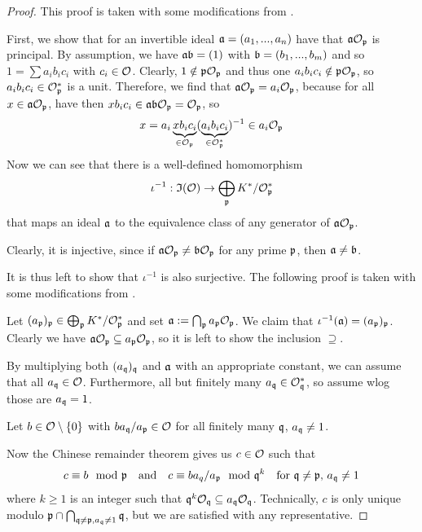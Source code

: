 \begin{proof}
    This proof is taken with some modifications from \cite[Prop.~I.12.9]{neukirch}.

    First, we show that for an invertible ideal $\mathfrak{a} = (a_1, ..., a_n)$ have that $\mathfrak{a}\mathcal{O}_{\mathfrak{p}}$ is principal.
    By assumption, we have $\mathfrak{a}\mathfrak{b} = (1)$ with $\mathfrak{b} = (b_1, ..., b_m)$ and so $1 = \sum a_i b_i c_i$ with $c_i \in \mathcal{O}$.
    Clearly, $1 \notin \mathfrak{p}\mathcal{O}_{\mathfrak{p}}$ and thus one $a_i b_i c_i \notin \mathfrak{p}\mathcal{O}_{\mathfrak{p}}$, so $a_i b_i c_i \in \mathcal{O}_{\mathfrak{p}}^*$ is a unit.
    Therefore, we find that $\mathfrak{a}\mathcal{O}_{\mathfrak{p}} = a_i\mathcal{O}_{\mathfrak{p}}$, because for all $x \in \mathfrak{a}\mathcal{O}_{\mathfrak{p}}$, have then $x b_i c_i \in \mathfrak{a}\mathfrak{b}\mathcal{O}_{\mathfrak{p}} = \mathcal{O}_{\mathfrak{p}}$, so
    \begin{equation*}
        x = a_i \underbrace{x b_i c_i}_{\in \mathcal{O}_{\mathfrak{p}}} (\underbrace{a_ib_ic_i}_{\in\mathcal{O}_{\mathfrak{p}}^*})^{-1} \in a_i \mathcal{O}_{\mathfrak{p}}
    \end{equation*}
    Now we can see that there is a well-defined homomorphism
    \begin{equation*}
        \iota^{-1}: \mathfrak{I}(\mathcal{O}) \to \bigoplus_{\mathfrak{p}} K^*/\mathcal{O}_{\mathfrak{p}}^*
    \end{equation*}
    that maps an ideal $\mathfrak{a}$ to the equivalence class of any generator of $\mathfrak{a}\mathcal{O}_{\mathfrak{p}}$.
    
    Clearly, it is injective, since if $\mathfrak{a}\mathcal{O}_{\mathfrak{p}} \neq \mathfrak{b}\mathcal{O}_{\mathfrak{p}}$ for any prime $\mathfrak{p}$, then $\mathfrak{a} \neq \mathfrak{b}$.

    It is thus left to show that $\iota^{-1}$ is also surjective.
    The following proof is taken with some modifications from \cite[Prop.~I.12.2]{neukirch}.

    Let $(a_{\mathfrak{p}})_{\mathfrak{p}} \in \bigoplus_{\mathfrak{p}} K^*/\mathcal{O}_{\mathfrak{p}}^*$ and set $\mathfrak{a} := \bigcap_{\mathfrak{p}} a_{\mathfrak{p}} \mathcal{O}_{\mathfrak{p}}$.
    We claim that $\iota^{-1}(\mathfrak{a}) = (a_{\mathfrak{p}})_{\mathfrak{p}}$. 
    Clearly we have $\mathfrak{a}\mathcal{O}_{\mathfrak{p}} \subseteq a_{\mathfrak{p}}\mathcal{O}_{\mathfrak{p}}$, so it is left to show the inclusion $\supseteq$.

    By multiplying both $(a_{\mathfrak{q}})_{\mathfrak{q}}$ and $\mathfrak{a}$ with an appropriate constant, we can assume that all $a_{\mathfrak{q}} \in \mathcal{O}$.
    Furthermore, all but finitely many $a_{\mathfrak{q}} \in \mathcal{O}_{\mathfrak{q}}^*$, so assume wlog those are $a_{\mathfrak{q}} = 1$.

    Let $b \in \mathcal{O} \setminus \{ 0 \}$ with $ba_{\mathfrak{q}}/a_{\mathfrak{p}} \in \mathcal{O}$ for all finitely many $\mathfrak{q}$, $a_{\mathfrak{q}} \neq 1$.

    Now the Chinese remainder theorem gives us $c \in \mathcal{O}$ such that
    \begin{equation*}
        c \equiv b \mod {\mathfrak{p}} \quad \text{and} \quad c \equiv b a_q/a_{\mathfrak{p}} \mod {\mathfrak{q}}^k \quad \text{for $\mathfrak{q} \neq \mathfrak{p}$, $a_{\mathfrak{q}} \neq 1$}
    \end{equation*}
    where $k \geq 1$ is an integer such that $\mathfrak{q}^k\mathcal{O}_{\mathfrak{q}} \subseteq a_{\mathfrak{q}}\mathcal{O}_{\mathfrak{q}}$.
    Technically, $c$ is only unique modulo $\mathfrak{p} \cap \bigcap_{\mathfrak{q} \neq \mathfrak{p}, a_{\mathfrak{q}} \neq 1} \mathfrak{q}$, but we are satisfied with any representative.


\end{proof}
